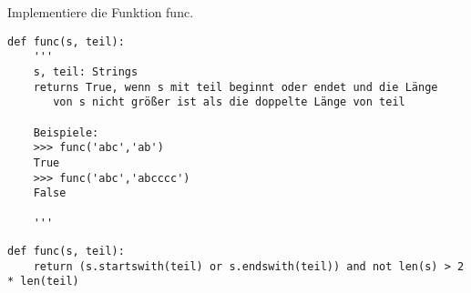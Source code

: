 \question[3] Implementiere die Funktion func.

\begin{lstlisting}
def func(s, teil):
    '''
    s, teil: Strings
    returns True, wenn s mit teil beginnt oder endet und die Länge
       von s nicht größer ist als die doppelte Länge von teil

    Beispiele:
    >>> func('abc','ab')
    True
    >>> func('abc','abcccc')
    False

    '''
\end{lstlisting}
\begin{solutionbox}{3cm}
\begin{lstlisting}
def func(s, teil):
    return (s.startswith(teil) or s.endswith(teil)) and not len(s) > 2 * len(teil)
\end{lstlisting}
\end{solutionbox}
